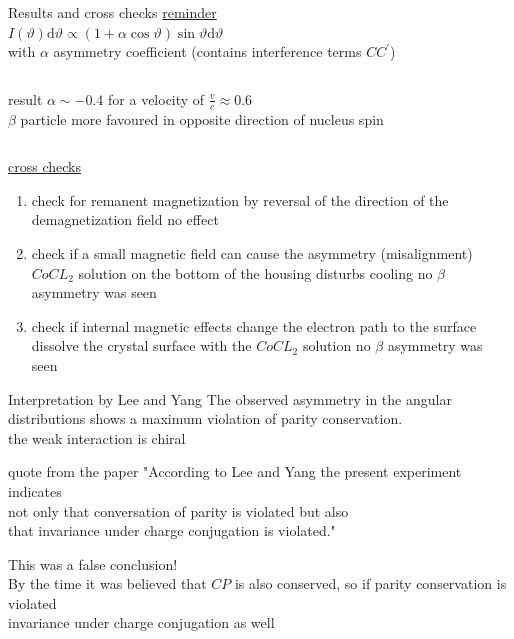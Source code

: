 \documentclass[aspectratio=1610, 10pt]{beamer}
\begin{document}
\begin{frame}{Results and cross checks}
	\underline{reminder}\\
	\vspace{0.2cm}
	$I(\vartheta) \text{d}\vartheta \propto (1 + \alpha \cos\vartheta)\sin\vartheta \text{d}\vartheta$\\
	with $\alpha$ asymmetry coefficient (contains interference terms $CC^{'}$)\\
	\begin{columns}
		\begin{block}{result}
			$\alpha \sim -0.4$ for a velocity of $\frac{v}{c}\approx 0.6$\\
			\textrightarrow $\beta$ particle more favoured in opposite direction of nucleus spin
		\end{block}
	\end{columns}
	\vspace{0.2cm}
	\underline{cross checks}
	\begin{enumerate}
		\item check for remanent magnetization by reversal of the direction of the demagnetization field \textrightarrow no effect
		\item check if a small magnetic field can cause the asymmetry (misalignment)\textrightarrow $CoCL_{2}$ solution on the bottom of the housing \textrightarrow disturbs cooling \textrightarrow no $\beta$ asymmetry was seen
		\item check if internal magnetic effects change the electron path to the surface \textrightarrow dissolve the crystal surface with the $CoCL_{2}$ solution \textrightarrow no $\beta$ asymmetry was seen
	\end{enumerate}
\end{frame}

\begin{frame}{Interpretation by Lee and Yang}
	The observed asymmetry in the angular distributions shows a maximum violation of parity conservation. \\
	\textrightarrow the weak interaction is chiral\\
	\begin{block}{quote from the paper\cite{PhysRev.105.1413}}
		"According to Lee and Yang\cite{PhysRev.106.340} the present experiment indicates\\ not only that conversation of parity is violated but also\\ that invariance under charge conjugation is violated."
	\end{block}
	\vspace{0.2cm}
	This was a false conclusion!\\
	By the time it was believed that $CP$ is also conserved, so if parity conservation is violated\\
	\textrightarrow invariance under charge conjugation as well
\end{frame}
\end{document}

